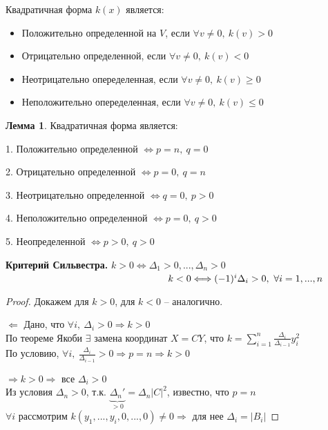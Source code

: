 \documentclass[a4paper, 12pt]{article}
\newcommand\tab[1][.5cm]{\hspace*{#1}}
\theoremstyle{definition}
\newtheorem*{lemma}{Лемма}
\begin{document}
    Квадратичная форма $k(x)$ является:
    \begin{itemize}
        \item Положительно определенной на $V$, если $\forall v 
        \neq 0,\ k(v) > 0$
        \item Отрицательно определенной, если $\forall v \neq 0,
        \ k(v) <0$    
        \item Неотрицательно опеределенная, если $\forall v 
        \neq 0,\ k(v) \geq 0$
        \item  Неположительно опеределенная, если $\forall v 
        \neq 0,\ k(v) \leq 0$
    \end{itemize}
    \begin{lemma}
        Квадратичная форма является:
        
        1. Положительно определенной $\Longleftrightarrow p = n,
        \ q = 0$
        
        2. Отрицательно определенной $\Longleftrightarrow p=0, 
        \ q= n$
        
        3. Неотрицательно определенной $\Longleftrightarrow q=0,
        \ p > 0$ 

        4. Неположительно определенной $\Longleftrightarrow  p 
        = 0,\ q > 0$ 

        5. Неопределенной $\Longleftrightarrow p > 0,\ q > 0$ 
    \end{lemma}
    \textbf{Критерий Сильвестра.} $k > 0 \Longleftrightarrow \Delta_1 > 0,...,\Delta_n > 0$\\
    $\tab[5.9cm]k < 0 \Longleftrightarrow (-1)^i \Delta_i > 0,\ \forall i = 1,...,n$ 
    \begin{proof}
        Докажем для $k > 0$, для $k < 0$ -- 
        аналогично.

        $\Longleftarrow$ Дано, что $\forall i,\ \Delta_i > 0
        \Longrightarrow k > 0$\\
        По теореме Якоби $\exists$ замена координат
        $X = CY$, что $k = \sum\limits_{i=1}^{n}
        \frac{\Delta_i}{\Delta_{i-1}}y_i^2$\\
        По условию, $\forall i,\ \frac{\Delta_i}{\Delta_{i-1}}
        > 0 \Longrightarrow p=n \Longrightarrow k > 0$

        $\Longrightarrow k > 0 \Longrightarrow $ все 
        $\Delta_i>0$\\
        Из условия $\Delta_n > 0$, т.к. $\underbrace{\Delta_n'}_
        {> 0} = \Delta_n|C|^2$, известно, что $p = n$\\
        $\forall i$ рассмотрим $k(y_1,...,y_i,0,...,0) \neq 0
        \Longrightarrow $ для нее $\Delta_i = |B_i|$ 
    \end{proof}
\end{document}
